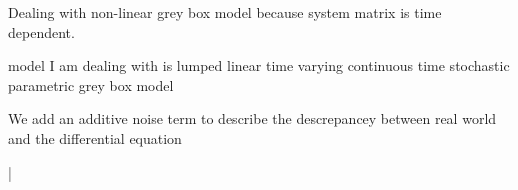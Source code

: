 Dealing with non-linear grey box model because system matrix is time dependent.

model I am dealing with is lumped linear time varying continuous time stochastic parametric grey box model


We add an additive noise term to describe the descrepancey between real world and the differential equation





|